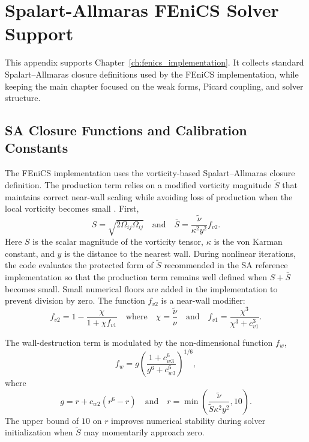\chapter{Spalart-Allmaras FEniCS Solver Support}
\label{app:sa_fenics_solver_support}

This appendix supports Chapter~\ref{ch:fenics_implementation}. It collects standard Spalart--Allmaras closure definitions used by the FEniCS implementation, while keeping the main chapter focused on the weak forms, Picard coupling, and solver structure.

\section{SA Closure Functions and Calibration Constants}
\label{app:sa_closure_terms}
The FEniCS implementation uses the vorticity-based Spalart--Allmaras closure definition. The production term relies on a modified vorticity magnitude $\tilde{S}$ that maintains correct near-wall scaling while avoiding loss of production when the local vorticity becomes small \cite{Spalart1994,NasaTurb}. First,
\begin{equation}
	S = \sqrt{2\Omega_{ij}\Omega_{ij}}
	\quad \text{and} \quad
	\bar{S} = \frac{\tilde{\nu}}{\kappa^2 y^2} f_{v2}.
\end{equation}
Here $S$ is the scalar magnitude of the vorticity tensor, $\kappa$ is the von Karman constant, and $y$ is the distance to the nearest wall. During nonlinear iterations, the code evaluates the protected form of $\tilde{S}$ recommended in the SA reference implementation \cite{NasaTurb} so that the production term remains well defined when $S+\bar{S}$ becomes small. Small numerical floors are added in the implementation to prevent division by zero. The function $f_{v2}$ is a near-wall modifier:
\begin{equation}
	f_{v2} = 1 - \frac{\chi}{1 + \chi f_{v1}} \quad \text{where} \quad \chi = \frac{\tilde{\nu}}{\nu} \quad \text{and} \quad f_{v1} = \frac{\chi^3}{\chi^3 + c_{v1}^3}.
\end{equation}

The wall-destruction term is modulated by the non-dimensional function $f_w$,
\begin{equation}
	f_w = g \left( \frac{1 + c_{w3}^6}{g^6 + c_{w3}^6} \right)^{1/6},
\end{equation}
where
\begin{equation}
	g = r + c_{w2}(r^6 - r) \quad \text{and} \quad r = \min \left( \frac{\tilde{\nu}}{\tilde{S} \kappa^2 y^2}, 10 \right).
\end{equation}
The upper bound of $10$ on $r$ improves numerical stability during solver initialization when $\tilde{S}$ may momentarily approach zero.

